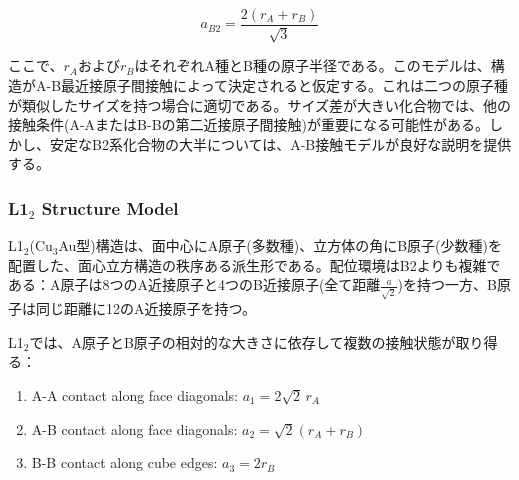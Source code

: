 \documentclass[a4paper,10pt,5p]{elsarticle}
\begin{document}
\begin{equation}
    a_{B2} = \frac{2(r_A + r_B)}{\sqrt{3}}
    \label{eq:B2}
\end{equation}

ここで、$r_A$および$r_B$はそれぞれA種とB種の原子半径である。このモデルは、構造がA-B最近接原子間接触によって決定されると仮定する。これは二つの原子種が類似したサイズを持つ場合に適切である。サイズ差が大きい化合物では、他の接触条件(A-AまたはB-Bの第二近接原子間接触)が重要になる可能性がある。しかし、安定なB2系化合物の大半については、A-B接触モデルが良好な説明を提供する。


\subsubsection{L1$_2$ Structure Model}

L1$_2$(Cu$_3$Au型)構造は、面中心にA原子(多数種)、立方体の角にB原子(少数種)を配置した、面心立方構造の秩序ある派生形である。配位環境はB2よりも複雑である：A原子は8つのA近接原子と4つのB近接原子(全て距離$\frac{a}{\sqrt{2}}$)を持つ一方、B原子は同じ距離に12のA近接原子を持つ。

L1$_2$では、A原子とB原子の相対的な大きさに依存して複数の接触状態が取り得る：



\begin{enumerate}
\setlength{\parskip}{0cm} %
\setlength{\itemsep}{0cm} %
    \item A-A contact along face diagonals: $a_1 = 2\sqrt{2}\, r_A$
    \item A-B contact along face diagonals: $a_2 = \sqrt{2}(r_A + r_B)$
    \item B-B contact along cube edges: $a_3 = 2r_B$
\end{enumerate}
\end{document}

